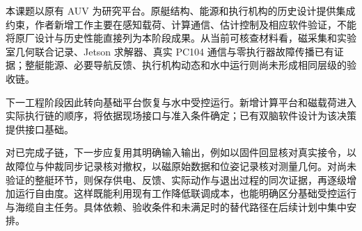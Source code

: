 本课题以原有 AUV 为研究平台。原艇结构、能源和执行机构的历史设计提供集成约束，作者新增工作主要在感知载荷、计算通信、估计控制及相应软件验证，不能将原厂设计与历史性能直接列为本阶段成果。从当前可核查材料看，磁采集和实验室几何联合记录、Jetson 求解器、真实 PC104 通信与零执行器故障传播已有证据；整艇能源、必要导航反馈、执行机构动态和水中运行则尚未形成相同层级的验收链。

下一工程阶段因此转向基础平台恢复与水中受控运行。新增计算平台和磁载荷进入实际执行链的顺序，将依据现场接口与准入条件确定；已有双脑软件设计为该决策提供接口基础。

对已完成子链，下一步应复用其明确输入输出，例如以固件回显核对真实接令，以故障位与仲裁同步记录核对撤权，以磁原始数据和位姿记录核对测量几何。对尚未验证的整艇环节，则保存供电、反馈、实际动作与退出过程的同次证据，再逐级增加运行自由度。这样既能利用现有工作降低联调成本，也能明确区分基础受控运行与海缆自主任务。具体依赖、验收条件和未满足时的替代路径在后续计划中集中安排。

